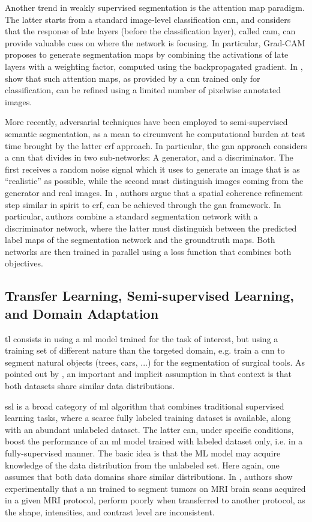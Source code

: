 Another trend in weakly supervised segmentation is the attention map paradigm.
The latter starts from a standard image-level classification \gls{cnn}, and considers that the response of late layers (before the classification layer), called \gls{cam}, can provide valuable cues on where the network is focusing.
In particular, Grad-CAM \cite{selvaraju17} proposes to generate segmentation maps by combining the activations of late layers with a weighting factor, computed using the backpropagated gradient.
In \cite{li18}, show that such attention maps, as provided by a \gls{cnn} trained only for classification, can be refined using a limited number of pixelwise annotated images.

More recently, adversarial techniques have been employed to semi-supervised semantic segmentation, as a mean to circumvent he computational burden at test time brought by the latter \gls{crf} approach.
In particular, the \gls{gan} approach \cite{goodfellow14} considers a \gls{cnn} that divides in two sub-networks: A generator, and a discriminator.
The first receives a random noise signal which it uses to generate an image that is as ``realistic'' as possible, while the second must distinguish images coming from the generator and real images.
In \cite{luc16}, authors argue that a spatial coherence refinement step similar in spirit to \gls{crf}, can be achieved through the \gls{gan} framework.
In particular, authors combine a standard segmentation network with a discriminator network,
where the latter must distinguish between the predicted label maps of the segmentation network and the groundtruth maps.
Both networks are then trained in parallel using a loss function that combines both objectives.


\subsection{Transfer Learning, Semi-supervised Learning, and Domain Adaptation}
\gls{tl} consists in using a \gls{ml} model trained for the task of interest, but using a training set of different nature than the targeted domain, e.g. train a \gls{cnn} to segment natural objects (trees, cars, ...) for the segmentation of surgical tools.
As pointed out by \cite{oliver18}, an important and implicit assumption in that context is that both datasets share similar data distributions.

\gls{ssl} is a broad category of \gls{ml} algorithm that combines traditional supervised learning tasks, where a scarce fully labeled training dataset is available, along with an abundant unlabeled dataset.
The latter can, under specific conditions, boost the performance of an \gls{ml} model trained with labeled dataset only, i.e. in a fully-supervised manner.
The basic idea is that the ML model may acquire knowledge of the data distribution from the unlabeled set.
Here again, one assumes that both data domains share similar distributions.
In \cite{ghafoorian17}, authors show experimentally that a \gls{nn} trained to segment tumors on MRI brain scans acquired in a given MRI protocol, perform poorly when transferred to another protocol, as the shape, intensities, and contrast level are inconsistent.


